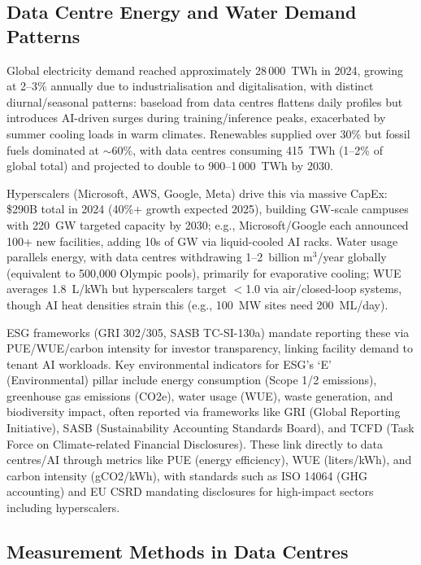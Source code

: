 \subsection{Data Centre Energy and Water Demand Patterns}

Global electricity demand reached approximately 28\,000~TWh in 2024, growing 
at 2--3\% annually due to industrialisation and digitalisation, with distinct 
diurnal/seasonal patterns: baseload from data centres flattens daily profiles 
but introduces AI-driven surges during training/inference peaks, exacerbated by
summer cooling loads in warm climates. Renewables supplied 
over 30\% but fossil fuels dominated at $\sim$60\%, with data centres 
consuming 415~TWh (1--2\% of global total) and projected to double to 
900--1\,000~TWh by 2030.

Hyperscalers (Microsoft, AWS, Google, Meta) drive this via massive CapEx: 
\$290B total in 2024 (40\%+ growth expected 2025), building GW-scale campuses 
with 220~GW targeted capacity by 2030; e.g., Microsoft/Google each announced 
100+ new facilities, adding 10s of GW via liquid-cooled AI racks. 
Water usage parallels energy, with data centres withdrawing 1--2~billion 
m$^3$/year globally (equivalent to 500,000 Olympic pools), primarily for 
evaporative cooling; WUE averages 1.8~L/kWh but hyperscalers target $<$1.0 via 
air/closed-loop systems, though AI heat densities strain this (e.g., 100~MW 
sites need 200~ML/day).  

ESG frameworks (GRI 302/305, SASB TC-SI-130a) mandate reporting these via 
PUE/WUE/carbon intensity for investor transparency, linking facility demand 
to tenant AI workloads. Key environmental indicators for ESG's `E' 
(Environmental) pillar include energy consumption (Scope 1/2 emissions), 
greenhouse gas emissions (CO2e), water usage (WUE), waste generation, 
and biodiversity impact, often reported via frameworks like GRI 
(Global Reporting Initiative), SASB (Sustainability Accounting Standards Board),
and TCFD (Task Force on Climate-related Financial Disclosures). 
These link directly to data centres/AI through metrics like PUE 
(energy efficiency), WUE (liters/kWh), and carbon intensity (gCO2/kWh), 
with standards such as ISO 14064 (GHG accounting) and EU CSRD mandating 
disclosures for high-impact sectors including hyperscalers.  

\subsection{Measurement Methods in Data Centres}

